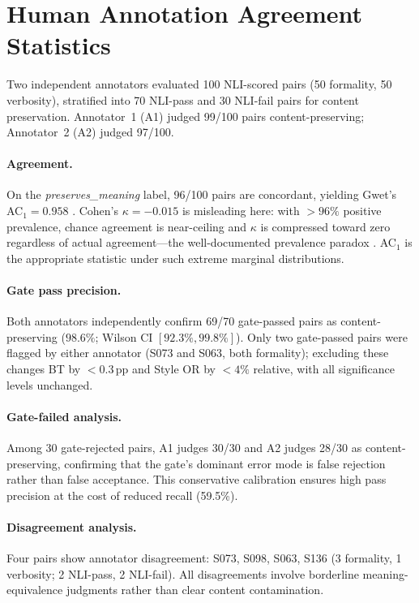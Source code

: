 \section{Human Annotation Agreement Statistics}
\label{app:annotation_agreement}

Two independent annotators evaluated 100 NLI-scored pairs (50 formality, 50 verbosity), stratified into 70 NLI-pass and 30 NLI-fail pairs for content preservation.
Annotator~1 (A1) judged 99/100 pairs content-preserving; Annotator~2 (A2) judged 97/100.

\paragraph{Agreement.}
On the \emph{preserves\_meaning} label, 96/100 pairs are concordant, yielding Gwet's AC$_1 = 0.958$ \citep{gwet2008ac1}.
Cohen's $\kappa = {-}0.015$ is misleading here: with ${>}96\%$ positive prevalence, chance agreement is near-ceiling and $\kappa$ is compressed toward zero regardless of actual agreement---the well-documented prevalence paradox \citep{feinstein1990kappa}.
AC$_1$ is the appropriate statistic under such extreme marginal distributions.

\paragraph{Gate pass precision.}
Both annotators independently confirm 69/70 gate-passed pairs as content-preserving ($98.6\%$; Wilson CI $[92.3\%, 99.8\%]$).
Only two gate-passed pairs were flagged by either annotator (S073 and S063, both formality); excluding these changes BT by ${<}0.3$\,pp and Style OR by ${<}4\%$ relative, with all significance levels unchanged.

\paragraph{Gate-failed analysis.}
Among 30 gate-rejected pairs, A1 judges 30/30 and A2 judges 28/30 as content-preserving, confirming that the gate's dominant error mode is false rejection rather than false acceptance.
This conservative calibration ensures high pass precision at the cost of reduced recall (59.5\%).

\paragraph{Disagreement analysis.}
Four pairs show annotator disagreement: S073, S098, S063, S136 (3 formality, 1 verbosity; 2 NLI-pass, 2 NLI-fail).
All disagreements involve borderline meaning-equivalence judgments rather than clear content contamination.

